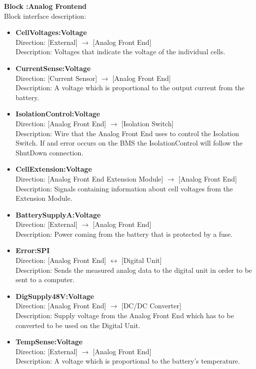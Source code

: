 \textbf{Block :Analog Frontend}\\
Block interface description:
\begin{itemize}
	\item \textbf{CellVoltages:Voltage}\\
	Direction: [External] $\rightarrow$ [Analog Front End]\\
	Description: Voltages that indicate the voltage of the individual cells.
	\item \textbf{CurrentSense:Voltage}\\
	Direction: [Current Sensor] $\rightarrow$ [Analog Front End]\\
	Description: A voltage which is proportional to the output current from the battery.
	\item \textbf{IsolationControl:Voltage}\\
	Direction: [Analog Front End] $\rightarrow$ [Isolation Switch]\\
	Description: Wire that the Analog Front End uses to control the Isolation Switch. If and error occurs on the BMS the IsolationControl will follow the ShutDown connection.
	\item \textbf{CellExtension:Voltage}\\
	Direction: [Analog Front End Extension Module] $\rightarrow$ [Analog Front End]\\
	Description: Signals containing information about cell voltages from the Extension Module.
	\item \textbf{BatterySupplyA:Voltage}\\
	Direction: [External] $\rightarrow$ [Analog Front End]\\
	Description: Power coming from the battery that is protected by a fuse.
	\item \textbf{Error:SPI}\\
	Direction: [Analog Front End] $\leftrightarrow$ [Digital Unit]\\
	Description: Sends the measured analog data to the digital unit in order to be sent to a computer.
	\item \textbf{DigSupply48V:Voltage}\\
	Direction: [Analog Front End] $\rightarrow$ [DC/DC Converter]\\
	Description: Supply voltage from the Analog Front End which has to be converted to be used on the Digital Unit.
	\item \textbf{TempSense:Voltage}\\
	Direction: [External] $\rightarrow$ [Analog Front End]\\
	Description: A voltage which is proportional to the battery's temperature.
\end{itemize}

